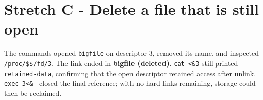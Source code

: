 \section{Stretch C - Delete a file that is still open}

The commands opened \texttt{bigfile} on descriptor 3, removed its name, and inspected \texttt{/\allowbreak{}proc/\allowbreak{}\$\$/\allowbreak{}fd/\allowbreak{}3}. The link ended in \textbf{bigfile (deleted)}. \texttt{cat <\&3} still printed \texttt{retained-data}, confirming that the open descriptor retained access after unlink. \texttt{exec 3<\&-} closed the final reference; with no hard links remaining, storage could then be reclaimed.

